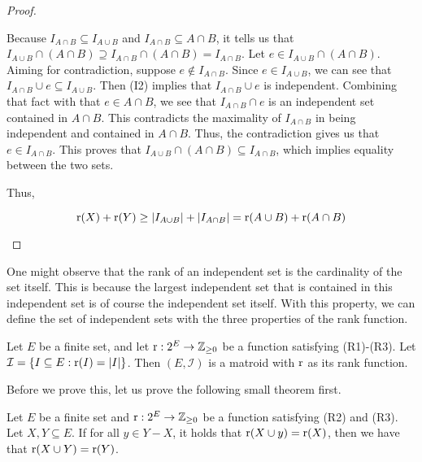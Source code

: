 \begin{proof}
\begin{enumerate}
        Because $I_{A\cap B}\subseteq I_{A\cup B}$ and $I_{A\cap B}\subseteq A\cap B$, it tells us that $I_{A\cup B}\cap (A\cap B) \supseteq I_{A\cap B}\cap (A\cap B) = I_{A\cap B} $. Let $e\in I_{A\cup B}\cap (A\cap B)$. Aiming for contradiction, suppose $e\notin I_{A\cap B}$. Since $e\in I_{A\cup B}$, we can see that $I_{A\cap B}\cup e \subseteq I_{A\cup B} $. Then (I2) implies that $I_{A\cap B}\cup e$ is independent. Combining that fact with that $e\in A\cap B$, we see that $I_{A\cap B}\cap e$ is an independent set contained in $A\cap B$. This contradicts the maximality of $I_{A\cap B}$ in being independent and contained in $A\cap B$. Thus, the contradiction gives us that $e\in I_{A\cap B}$. This proves that $I_{A\cup B}\cap(A\cap B)\subseteq I_{A\cap B} $, which implies equality between the two sets.

        Thus,

        $$ \operatorname{r}(X)+\operatorname{r}(Y) \geq  |I_{A\cup B}|+|I_{A\cap B}| = \operatorname{r}(A\cup B)+\operatorname{r}(A\cap B) $$
    \end{enumerate}
\end{proof}
One might observe that the rank of an independent set is the cardinality of the set itself. This is because the largest independent set that is contained in this independent set is of course the independent set itself. With this property, we can define the set of independent sets with the three properties of the rank function.
\begin{theorem}
    \label{thm:indep-from-bases}
    Let $E$ be a finite set, and let $\operatorname{r} : 2^E \rightarrow \mathbb{Z}_{\geq0}$ be a function satisfying (R1)-(R3). Let $\mathcal{I} = \{ I\subseteq E : \operatorname{r}(I)=|I| \} $. Then $(E,\mathcal{I})$ is a matroid with $\operatorname{r}$ as its rank function.
\end{theorem}
Before we prove this, let us prove the following small theorem first.
\begin{theorem}
\label{rankextension}
    Let $E$ be a finite set and $\operatorname{r}:2^E\rightarrow \mathbb{Z}_{\geq0}$ be a function satisfying (R2) and (R3). Let $X,Y\subseteq E$. If for all $y\in Y-X$, it holds that $\operatorname{r}(X\cup y)=\operatorname{r}(X)$, then we have that $\operatorname{r}(X\cup Y)=\operatorname{r}(Y)$.
\end{theorem}

